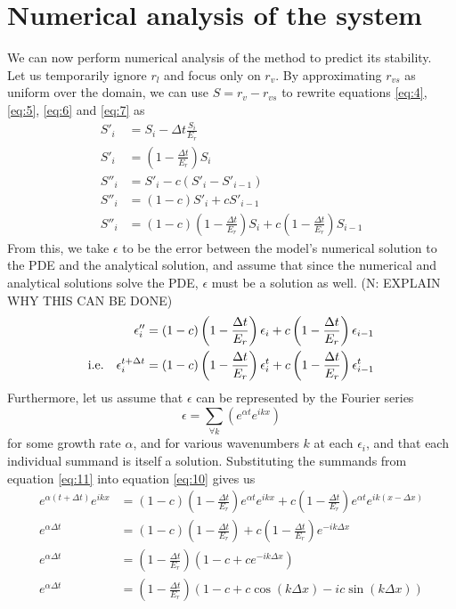\documentclass[11pt]{article}
\begin{document}
\section{Numerical analysis of the system}
We can now perform numerical analysis of the method to predict its stability. \\
Let us temporarily ignore $r_l$ and focus only on $r_v$. By approximating $r_{vs}$ as uniform over the domain, we can use $S=r_v-r_{vs}$ to rewrite equations \ref{eq:4}, \ref{eq:5}, \ref{eq:6} and \ref{eq:7} as
\begin{align}
S'_i &= S_i - \Delta t\frac{S_i}{E_r}		\nonumber \\
S'_i &= \left(1-\frac{\Delta t}{E_r}\right)S_i	\nonumber \\
S''_i &= S'_i - c\left(S'_i - S'_{i-1}\right)		\nonumber \\
S''_i &= \left(1-c\right)S'_i + cS'_{i-1}		\nonumber \\
S''_i &= \left(1-c\right)\left(1-\frac{\Delta t}{E_r}\right)S_i + c\left(1-\frac{\Delta t}{E_r}\right)S_{i-1}	\label{eq:9}
\end{align}
From this, we take $\epsilon$ to be the error between the model's numerical solution to the PDE and the analytical solution, and assume that since the numerical and analytical solutions solve the PDE, $\epsilon$ must be a solution as well. (N: EXPLAIN WHY THIS CAN BE DONE)
\begin{align} \nonumber
\epsilon''_i &= \left(1-c\right)\left(1-\frac{\Delta t}{E_r}\right)\epsilon_i + c\left(1-\frac{\Delta t}{E_r}\right)\epsilon_{i-1} \\
\label{eq:10} \text{i.e.\quad}
\epsilon^{t+\Delta t}_i &= \left(1-c\right)\left(1-\frac{\Delta t}{E_r}\right)\epsilon^t_i
+ c\left(1-\frac{\Delta t}{E_r}\right)\epsilon^t_{i-1}
\end{align}
Furthermore, let us assume that $\epsilon$ can be represented by the Fourier series
\begin{equation} \label{eq:11}
\epsilon = \sum_{\forall k}\left(e^{\alpha t}e^{ikx}\right)
\end{equation}
for some growth rate $\alpha$, and for various wavenumbers $k$ at each $\epsilon_i$, and that each individual summand is itself a solution. Substituting the summands from equation \ref{eq:11} into equation \ref{eq:10} gives us
\begin{align*}
e^{\alpha\left(t+\Delta t\right)}e^{ikx}
&= \left(1-c\right)\left(1-\frac{\Delta t}{E_r}\right)e^{\alpha t}e^{ikx}
+ c\left(1-\frac{\Delta t}{E_r}\right)e^{\alpha t}e^{ik\left(x-\Delta x\right)} \\
e^{\alpha\Delta t}
&= \left(1-c\right)\left(1-\frac{\Delta t}{E_r}\right)
+ c\left(1-\frac{\Delta t}{E_r}\right)e^{-ik\Delta x} \\
e^{\alpha\Delta t}
&= \left(1-\frac{\Delta t}{E_r}\right)\left(1-c+ce^{-ik\Delta x}\right) \\
e^{\alpha\Delta t}
&= \left(1-\frac{\Delta t}{E_r}\right)\left(1-c+c\cos\left(k\Delta x\right)-ic\sin\left(k\Delta x\right)\right)
\end{align*}
\end{document}
